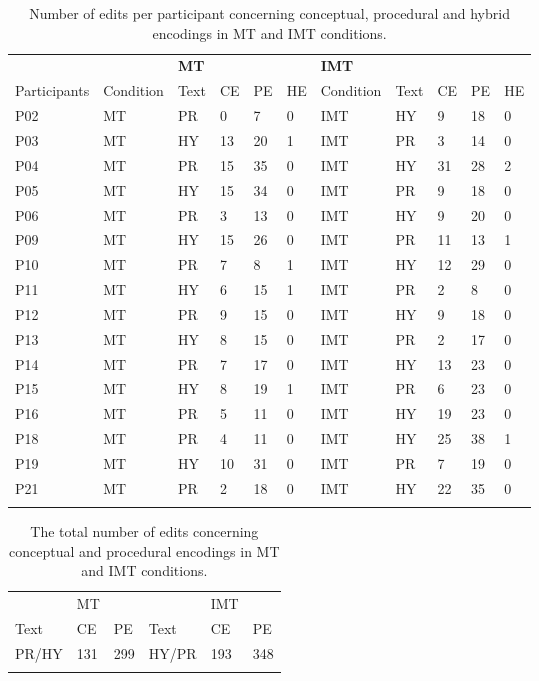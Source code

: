 \documentclass[output=paper]{langsci/langscibook}
\begin{document}
\begin{table}
\begin{tabular}{lllllllllll}
\lsptoprule
\hhline{~----------} &  & {\bfseries     MT} & {\bfseries ~} & {\bfseries ~} & \bfseries ~ & \multicolumn{3}{l}{\bfseries                                IMT} & {\bfseries ~} & \bfseries ~\\
Participants & Condition & Text & CE & PE & HE & Condition & Text & CE & PE & HE\\
P02 & MT & PR & 0 & 7 & 0 & IMT & HY & 9 & 18 & 0\\
P03 & MT & HY & 13 & 20 & 1 & IMT & PR & 3 & 14 & 0\\
P04 & MT & PR & 15 & 35 & 0 & IMT & HY & 31 & 28 & 2\\
P05 & MT & HY & 15 & 34 & 0 & IMT & PR & 9 & 18 & 0\\
P06 & MT & PR & 3 & 13 & 0 & IMT & HY & 9 & 20 & 0\\
P09 & MT & HY & 15 & 26 & 0 & IMT & PR & 11 & 13 & 1\\
P10 & MT & PR & 7 & 8 & 1 & IMT & HY & 12 & 29 & 0\\
P11 & MT & HY & 6 & 15 & 1 & IMT & PR & 2 & 8 & 0\\
P12 & MT & PR & 9 & 15 & 0 & IMT & HY & 9 & 18 & 0\\
P13 & MT & HY & 8 & 15 & 0 & IMT & PR & 2 & 17 & 0\\
P14 & MT & PR & 7 & 17 & 0 & IMT & HY & 13 & 23 & 0\\
P15 & MT & HY & 8 & 19 & 1 & IMT & PR & 6 & 23 & 0\\
P16 & MT & PR & 5 & 11 & 0 & IMT & HY & 19 & 23 & 0\\
P18 & MT & PR & 4 & 11 & 0 & IMT & HY & 25 & 38 & 1\\
P19 & MT & HY & 10 & 31 & 0 & IMT & PR & 7 & 19 & 0\\
P21 & MT & PR & 2 & 18 & 0 & IMT & HY & 22 & 35 & 0\\
\lspbottomrule
\end{tabular}
\caption{Number of edits per participant concerning conceptual, procedural and hybrid encodings in MT and IMT conditions.}
\label{tab:1}
\end{table}

\begin{table}
\begin{tabular}{llllll}
\lsptoprule
{~} & {MT} & ~ & {~} & {IMT} & ~\\
Text & CE & PE & Text & CE & PE\\
PR/HY & 131 & 299 & HY/PR & 193 & 348\\
\lspbottomrule
\end{tabular}
\caption{The total number of edits concerning conceptual and procedural encodings in MT and IMT conditions.}
\label{tab:2}
\end{table}
\end{document}
